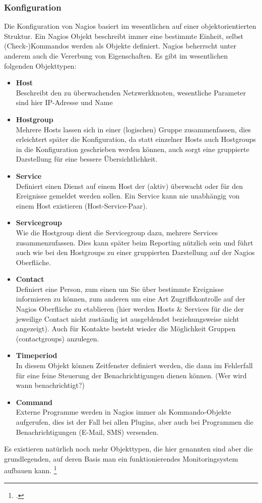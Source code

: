 \documentclass[12pt,a4paper,parskip,listof=totoc,bibliography=totoc]{scrreprt}
\begin{document}
	\subsubsection{Konfiguration}
	Die Konfiguration von Nagios basiert im wesentlichen auf einer objektorientierten Struktur. Ein Nagios Objekt beschreibt immer eine bestimmte Einheit, selbst (Check-)Kommandos werden als Objekte definiert. Nagios beherrscht unter anderem auch die Vererbung von Eigenschaften. Es gibt im wesentlichen folgenden Objekttypen:
	\begin{itemize}	
		\item \textbf{Host} \\
		Beschreibt den zu überwachenden Netzwerkknoten, wesentliche Parameter sind hier IP-Adresse und Name
		\item \textbf{Hostgroup} \\
		Mehrere Hosts lassen sich in einer (logischen) Gruppe zusammenfassen, dies erleichtert später die Konfiguration, da statt einzelner Hosts auch Hostgroups in die Konfiguration geschrieben werden können, auch sorgt eine gruppierte Darstellung für eine bessere Übersichtlichkeit.
		\item \textbf{Service} \\
		Definiert einen Dienst auf einem Host der (aktiv) überwacht oder für den Ereignisse gemeldet werden sollen. Ein Service kann nie unabhängig von einem Host existieren (Host-Service-Paar).
		\item \textbf{Servicegroup} \\
		Wie die Hostgroup dient die Servicegroup dazu, mehrere Services zusammenzufassen. Dies kann später beim Reporting nützlich sein und führt auch wie bei den Hostgroups zu einer gruppierten Darstellung auf der Nagios Oberfläche.
		\item \textbf{Contact} \\
		Definiert eine Person, zum einen um Sie über bestimmte Ereignisse informieren zu können, zum anderen um eine Art Zugriffskontrolle auf der Nagios Oberfläche zu etablieren (hier werden Hosts \& Services für die der jeweilige Contact nicht zuständig ist ausgeblendet beziehungsweise nicht angezeigt). Auch für Kontakte besteht wieder die Möglichkeit Gruppen (contactgroups) anzulegen.
		\item \textbf{Timeperiod} \\
		In diesem Objekt können Zeitfenster definiert werden, die dann im Fehlerfall für eine feine Steuerung der Benachrichtigungen dienen können. (Wer wird wann benachrichtigt?)
		\pagebreak
		\item \textbf{Command} \\
		Externe Programme werden in Nagios immer als Kommando-Objekte aufgerufen, dies ist der Fall bei allen Plugins, aber auch bei Programmen die Benachrichtigungen (E-Mail, SMS) versenden. 
	\end{itemize}
	Es existieren natürlich noch mehr Objekttypen, die hier genannten sind aber die grundlegenden, auf deren Basis man ein funktionierendes Monitoringsystem aufbauen kann.
	\footcite[Kapitel 2.2]{barthnagios}
	
\end{document}
